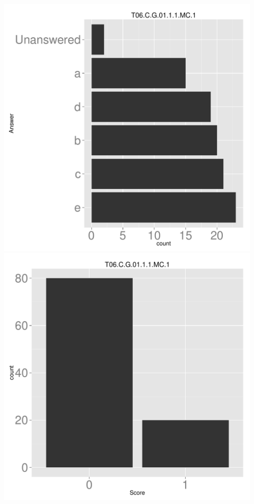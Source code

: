 \documentclass[12pt,nohyper]{tufte-handout}\usepackage[]{graphicx}\usepackage[]{color}
\begin{document}
\begin{center} \includegraphics[width=.45\linewidth]{Topic06_19_answer} \includegraphics[width=.45\linewidth]{Topic06_19_score} \end{center} 
\end{document}
